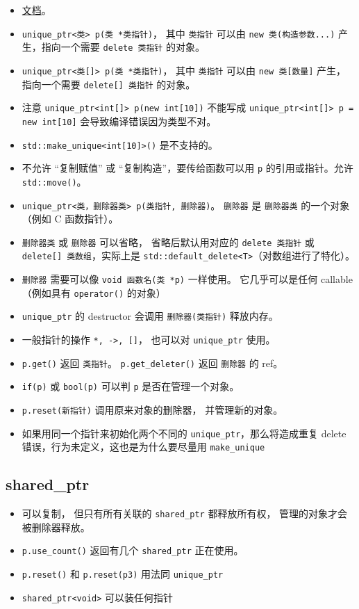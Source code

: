 \begin{itemize}
\item \href{https://en.cppreference.com/w/cpp/memory/unique_ptr}{文档}。
\item \verb`unique_ptr<类> p(类 *类指针)`， 其中 \verb`类指针` 可以由 \verb`new 类(构造参数...)` 产生，指向一个需要 \verb`delete 类指针` 的对象。
\item \verb`unique_ptr<类[]> p(类 *类指针)`， 其中 \verb`类指针` 可以由 \verb`new 类[数量]` 产生，指向一个需要 \verb`delete[] 类指针` 的对象。
\item 注意 \verb`unique_ptr<int[]> p(new int[10])` 不能写成 \verb`unique_ptr<int[]> p = new int[10]` 会导致编译错误因为类型不对。
\item \verb`std::make_unique<int[10]>()` 是不支持的。
\item 不允许 “复制赋值” 或 “复制构造”，要传给函数可以用 \verb`p` 的引用或指针。允许 \verb`std::move()`。
\item \verb`unique_ptr<类，删除器类> p(类指针, 删除器)`。 \verb`删除器` 是 \verb`删除器类` 的一个对象（例如 C 函数指针）。
\item \verb`删除器类` 或 \verb`删除器` 可以省略， 省略后默认用对应的 \verb`delete 类指针` 或 \verb`delete[] 类数组`，实际上是 \verb`std::default_delete<T>`（对数组进行了特化）。
\item \verb`删除器` 需要可以像 \verb`void 函数名(类 *p)` 一样使用。 它几乎可以是任何 callable（例如具有 \verb`operator()` 的对象）
\item \verb`unique_ptr` 的 destructor 会调用 \verb`删除器(类指针)` 释放内存。
\item 一般指针的操作 \verb`*, ->, []`， 也可以对 \verb`unique_ptr` 使用。
\item \verb`p.get()` 返回 \verb`类指针`。 \verb`p.get_deleter()` 返回 \verb`删除器` 的 ref。
\item \verb`if(p)` 或 \verb`bool(p)` 可以判 \verb`p` 是否在管理一个对象。
\item \verb`p.reset(新指针)` 调用原来对象的删除器， 并管理新的对象。
\item 如果用同一个指针来初始化两个不同的 \verb`unique_ptr`，那么将造成重复 delete 错误，行为未定义，这也是为什么要尽量用 \verb`make_unique`
\end{itemize}


\subsection{shared\_ptr}
\begin{itemize}
\item 可以复制， 但只有所有关联的 \verb`shared_ptr` 都释放所有权， 管理的对象才会被删除器释放。
\item \verb`p.use_count()` 返回有几个 \verb`shared_ptr` 正在使用。
\item \verb`p.reset()` 和 \verb`p.reset(p3)` 用法同 \verb`unique_ptr`
\item \verb`shared_ptr<void>` 可以装任何指针
\end{itemize}

